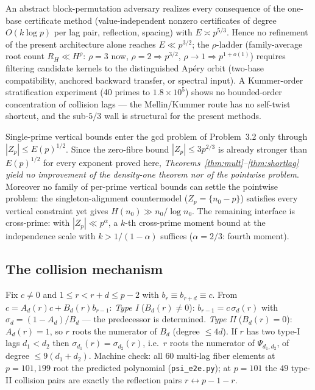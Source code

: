 \begin{proposition}\label{prop:ceiling}
An abstract block-permutation adversary realizes every consequence of the
one-base certificate method (value-independent nonzero certificates of degree
$O(k\log p)$ per lag pair, reflection, spacing) with $E\asymp p^{5/3}$.  Hence
no refinement of the present architecture alone reaches $E\ll p^{3/2}$; the
$\rho$-ladder (family-average root count $R_H\ll H^\rho$: $\rho=3$ now,
$\rho=2\Rightarrow p^{3/2}$, $\rho\to1\Rightarrow p^{1+o(1)}$) requires
filtering candidate kernels to the distinguished Ap\'ery orbit (two-base
compatibility, anchored backward transfer, or spectral input).  A Kummer-order
stratification experiment (40 primes to $1.8\times10^5$) shows no bounded-order
concentration of collision lags — the Mellin/Kummer route has no self-twist
shortcut, and the sub-$5/3$ wall is structural for the present methods.
\end{proposition}

\begin{proposition}\label{prop:limitation}
Single-prime vertical bounds enter the gcd problem of
Problem~3.2 only through $|Z_p|\le E(p)^{1/2}$.  Since the zero-fibre bound
$|Z_p|\le3p^{2/3}$ is already stronger than $E(p)^{1/2}$ for every exponent
proved here, \emph{Theorems~\ref{thm:mult}--\ref{thm:shortlag} yield no
improvement of the density-one theorem nor of the pointwise problem}.  Moreover
no family of per-prime vertical bounds can settle the pointwise problem: the
singleton-alignment countermodel ($Z_p=\{n_0-p\}$) satisfies every vertical
constraint yet gives $H(n_0)\gg n_0/\log n_0$.  The remaining interface is
cross-prime: with $|Z_p|\ll p^\alpha$, a $k$-th cross-prime moment bound at the
independence scale with $k>1/(1-\alpha)$ suffices ($\alpha=2/3$: fourth moment).
\end{proposition}

\subsection{The collision mechanism}

Fix $c\ne0$ and $1\le r<r+d\le p-2$ with $b_r\equiv b_{r+d}\equiv c$.  From
$c=A_d(r)c+B_d(r)b_{r-1}$:
\emph{Type I} ($B_d(r)\ne0$): $b_{r-1}=c\,\sigma_d(r)$ with
$\sigma_d=(1-A_d)/B_d$ — the predecessor is determined.
\emph{Type II} ($B_d(r)=0$): $A_d(r)=1$, so $r$ roots the numerator of $B_d$
(degree $\le4d$).  If $r$ has two type-I lags $d_1<d_2$ then
$\sigma_{d_1}(r)=\sigma_{d_2}(r)$, i.e.\ $r$ roots the numerator of
$\Psi_{d_1,d_2}$, of degree $\le9(d_1+d_2)$.
Machine check: all $60$ multi-lag fiber elements at $p=101,199$ root the
predicted polynomial (\texttt{psi\_e2e.py}); at $p=101$ the $49$ type-II
collision pairs are exactly the reflection pairs $r\leftrightarrow p-1-r$.

